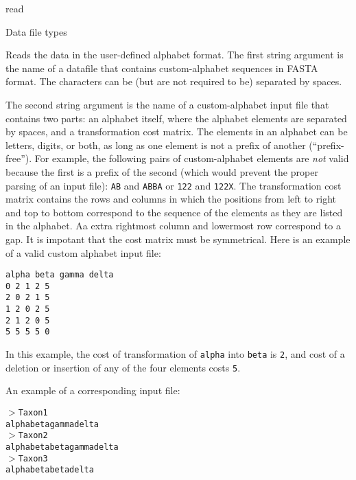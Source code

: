 \begin{command}{read}{}
\begin{arguments}
\begin{argumentgroup}{Data file types}
            {Reads the data in the user-defined alphabet format. The first string argument is
            the name of a datafile that contains custom-alphabet sequences in FASTA format. 
            The characters can be (but are not required to be) separated by spaces.
            
            The second string argument is the name of a custom-alphabet input file that contains two parts:
            an alphabet itself, where the alphabet elements are separated by spaces, and a
            transformation cost matrix. The elements in an alphabet can be letters, digits, or
            both, as long as one element is not a prefix of another  (``prefix-free''). For
            example, the following pairs of custom-alphabet elements are \emph{not} valid
            because the first is a prefix of the second (which would prevent the proper parsing of
            an input file): \texttt{AB} and \texttt{ABBA} or \texttt{122} and \texttt{122X}.
            The transformation cost matrix contains the rows and columns in which the
            positions from left to right and top to bottom correspond to the sequence of the
            elements as they are listed in the alphabet. Aa extra rightmost column and lowermost
            row correspond to a gap. It is impotant that the cost matrix must be symmetrical. Here
            is an example of a valid custom alphabet input file:
       	  
	  \texttt{alpha beta gamma delta \\
            0 2 1 2 5 \\
            2 0 2 1 5 \\
            1 2 0 2 5 \\
            2 1 2 0 5 \\
            5 5 5 5 0}
            
           In this example, the cost of transformation of \texttt{alpha} into \texttt{beta} is \texttt{2},
           and cost of a deletion or insertion of any of the four elements costs \texttt{5}.
           
           An example of a corresponding input file:
       
           \texttt{$>$Taxon1\\
	alphabetagammadelta\\
	$>$Taxon2\\
	alphabetabetagammadelta\\
	$>$Taxon3\\
	alphabetabetadelta}
	
}
\end{argumentgroup}
\end{arguments}
\end{command}
